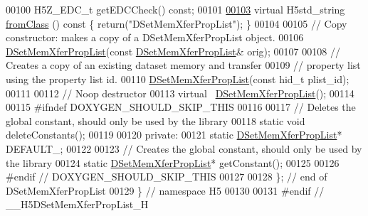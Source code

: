 \begin{DoxyCode}
00100         H5Z\_EDC\_t getEDCCheck() \textcolor{keyword}{const};
00101 
\hyperlink{class_h5_1_1_d_set_mem_xfer_prop_list_ad08ac681bb8862694b6387b40d4083e9}{00103}         \textcolor{keyword}{virtual} H5std\_string \hyperlink{class_h5_1_1_d_set_mem_xfer_prop_list_ad08ac681bb8862694b6387b40d4083e9}{fromClass} ()\textcolor{keyword}{ const }\{ \textcolor{keywordflow}{return}(\textcolor{stringliteral}{"DSetMemXferPropList"}); \}
00104 
00105         \textcolor{comment}{// Copy constructor: makes a copy of a DSetMemXferPropList object.}
00106         \hyperlink{class_h5_1_1_d_set_mem_xfer_prop_list}{DSetMemXferPropList}(\textcolor{keyword}{const} \hyperlink{class_h5_1_1_d_set_mem_xfer_prop_list}{DSetMemXferPropList}& orig);
00107 
00108         \textcolor{comment}{// Creates a copy of an existing dataset memory and transfer}
00109         \textcolor{comment}{// property list using the property list id.}
00110         \hyperlink{class_h5_1_1_d_set_mem_xfer_prop_list}{DSetMemXferPropList}(\textcolor{keyword}{const} hid\_t plist\_id);
00111 
00112         \textcolor{comment}{// Noop destructor}
00113         \textcolor{keyword}{virtual} ~\hyperlink{class_h5_1_1_d_set_mem_xfer_prop_list}{DSetMemXferPropList}();
00114 
00115 \textcolor{preprocessor}{#ifndef DOXYGEN\_SHOULD\_SKIP\_THIS}
00116 
00117         \textcolor{comment}{// Deletes the global constant, should only be used by the library}
00118         \textcolor{keyword}{static} \textcolor{keywordtype}{void} deleteConstants();
00119 
00120     \textcolor{keyword}{private}:
00121         \textcolor{keyword}{static} \hyperlink{class_h5_1_1_d_set_mem_xfer_prop_list}{DSetMemXferPropList}* DEFAULT\_;
00122 
00123         \textcolor{comment}{// Creates the global constant, should only be used by the library}
00124         \textcolor{keyword}{static} \hyperlink{class_h5_1_1_d_set_mem_xfer_prop_list}{DSetMemXferPropList}* getConstant();
00125 
00126 \textcolor{preprocessor}{#endif // DOXYGEN\_SHOULD\_SKIP\_THIS}
00127 
00128 \}; \textcolor{comment}{// end of DSetMemXferPropList}
00129 \} \textcolor{comment}{// namespace H5}
00130 
00131 \textcolor{preprocessor}{#endif // \_\_H5DSetMemXferPropList\_H}
\end{DoxyCode}
